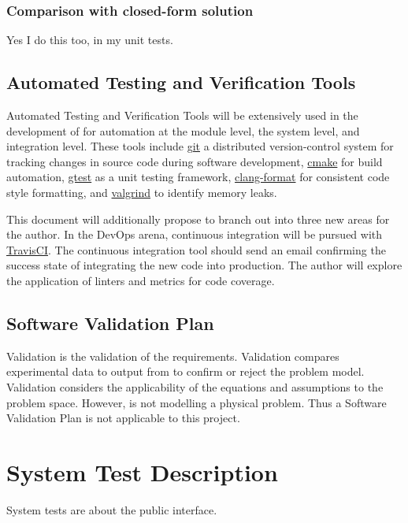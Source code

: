 \documentclass[12pt, titlepage]{article}
\begin{document}
\subsubsection{Comparison with closed-form solution}
Yes I do this too, in my unit tests.


\subsection{Automated Testing and Verification Tools}

Automated Testing and Verification Tools will be extensively used in the development of 
for automation at the module level, the system level, and integration level.
These tools include
\href{https://git.kernel.org/pub/scm/git/git.git}{git} a distributed version-control system
for tracking changes in source code during software development,
\href{https://cmake.org/}{cmake} for build automation,
\href{https://github.com/google/googletest}{gtest}
as a unit testing framework, \href{http://clang.llvm.org/docs/ClangFormat.html}{clang-format}
for consistent code style formatting, and \href{https://www.valgrind.org}{valgrind}
to identify memory leaks.

This document will additionally propose to branch out into three new areas for the author.
In the DevOps arena,
continuous integration will be pursued with \href{https://travis-ci.org}{TravisCI}.
The continuous integration tool should send an email confirming the success state
of integrating the new code into production.
The author will explore the application of linters and metrics for code coverage.

\subsection{Software Validation Plan}

Validation is the validation of the requirements. Validation compares experimental
data to output from  to confirm or reject the problem model. Validation
considers the applicability of the equations and assumptions to the problem space.
However,  is not modelling a physical problem. Thus a
Software Validation Plan is not applicable to this project.

\section{System Test Description}

System tests are about the public interface.
\end{document}
